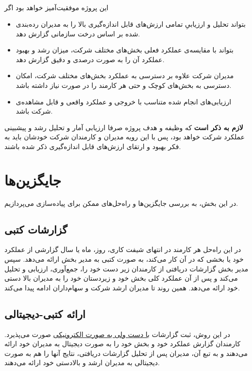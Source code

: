 \documentclass[12pt]{article}
\begin{document}
\subsection{}
این پروژه موفقیت‌آمیز خواهد بود اگر
\begin{itemize}
    \item 
    بتواند تحلیل و ارزیابیِ تمامی ارزش‌های قابل‌ اندازه‌گیری بالا را به مدیران رده‌بندی‌ شده بر اساس درخت سازمانی گزارش دهد.
    \item 
    بتواند با مقایسه‌ی عملکرد فعلی بخش‌های مختلف شرکت، میزان رشد و بهبود عملکرد آن را به صورت درصدی و دقیق گزارش دهد.
    \item
    مدیران شرکت علاوه‌ بر دسترسی به عملکرد بخش‌های مختلف شرکت، امکان دسترسی به بخش‌های کوچک و حتی هر کارمند را در صورت نیاز داشته باشد.

    \item 
    ارزیابی‌های انجام شده متناسب‌ با خروجی و عملکرد واقعی و قابل مشاهده‌ی شرکت باشد.
\end{itemize}

\textbf{لازم به ذکر است}
 که وظیفه و هدف پروژه صرفا ارزیابی آمار و تحلیل رشد و پیشبینی عملکرد شرکت خواهد بود، پس با این رویه مدیران و کارمندان شرکت خودشان باید به فکر بهبود و ارتقای ارزش‌های قابل اندازه‌گیری ذکر شده باشند.

\section{جایگزین‌ها}
در این بخش، به بررسی جایگزین‌ها و راه‌حل‌های ممکن برای پیاده‌سازی  می‌پردازیم.

\subsection{گزارشات کتبی }\label{written-report}
در این راه‌حل هر کارمند در انتهای شیفت کاری، روز، ماه یا سال گزارشی از عملکرد خود یا بخشی که در آن کار می‌کند، به صورت کتبی به مدیر بخش ارائه می‌دهد. سپس مدیر بخش گزارشات دریافتی از کارمندان زیر دست خود را، جمع‌آوری، ارزیابی و تحلیل می‌کند و پس از آن عملکرد کلی بخش خود و زیردستان خود را به مدیران بالا دستی خود ارائه می‌دهد.
همین روند تا مدیران ارشد شرکت و سهام‌داران ادامه پیدا می‌کند.
\subsection{ارائه کتبی-دیجیتالی }\label{half-digital}
در این روش، ثبت گزارشات \underline{با دست ولی به صورت الکترونیکی} صورت می‌پذیرد.
کارمندان گزارش عملکرد خود و بخش خود را به صورت دیجیتال به مدیران خود ارائه می‌دهند و به تبع آن، مدیران پس از تحلیل گزارشات دریافتی، نتایج آنها را هم به صورت دیجیتالی به مدیران ارشد و بالادستی خود ارائه می‌دهند.
\end{document}
